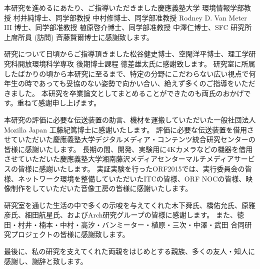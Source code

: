 \begin{acknowledgment}

本研究を進めるにあたり、ご指導いただきました慶應義塾大学 環境情報学部教授 村井純博士、同学部教授 中村修博士、同学部准教授 Rodney D. Van Meter III 博士、同学部准教授 植原啓介博士、同学部准教授 中澤仁博士、SFC 研究所 上席所員 (訪問) 斉藤賢爾博士に感謝致します。

研究について日頃からご指導頂きました松谷健史博士、空閑洋平博士、理工学研究科開放環境科学専攻 後期博士課程 徳差雄太氏に感謝致します。
研究室に所属したばかりの頃から本研究に至るまで、特定の分野にこだわらない広い視点で何年生の時であっても妥協のない姿勢で向かい合い、絶えず多くのご指導をいただきました。
本研究を卒業論文としてまとめることができたのも両氏のおかげです。重ねて感謝申し上げます。

本研究の評価に必要な伝送装置の助言、機材を運搬していただいた一般社団法人 Mozilla Japan 工藤紀篤博士に感謝いたします。
評価に必要な伝送装置を借用させていただいた慶應義塾大学デジタルメディア・コンテンツ統合研究センターの皆様に感謝いたします。
長期の間、開発、実験用に4Kカメラなどの機器を借用させていただいた慶應義塾大学湘南藤沢メディアセンターマルチメディアサービスの皆様に感謝いたします。
実証実験を行ったORF2015では、実行委員会の皆様、ネットワーク環境を整備していただいたITCの皆様、ORF NOCの皆様、映像制作をしていただいた音像工房の皆様に感謝いたします。

研究室を通じた生活の中で多くの示唆を与えてくれた木下舜氏、橋佑允氏、原雅彦氏、細田航星氏、およびArch研究グループの皆様に感謝します。
また、徳田・村井・楠本・中村・高汐・バンミーター・植原・三次・中澤・武田 合同研究プロジェクトの皆様に感謝致します。

最後に、私の研究を支えてくれた両親をはじめとする親族、多くの友人・知人に感謝し、謝辞と致します。

\end{acknowledgment}
